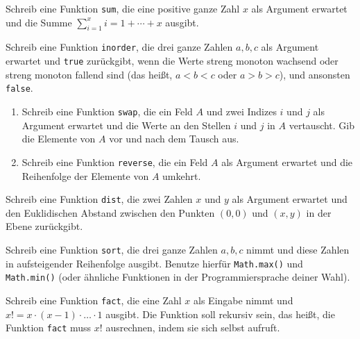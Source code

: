 \documentclass{uebung_cs}
\begin{document}
\begin{aufgabe}[Summe]
    Schreib eine Funktion \texttt{sum}, die eine positive ganze Zahl $x$ als Argument erwartet und die Summe $\sum_{i=1}^x i = 1+\cdots+x$ ausgibt.
\end{aufgabe}

\begin{aufgabe}
    Schreib eine Funktion \texttt{inorder}, die drei ganze Zahlen $a,b,c$ als Argument erwartet und \texttt{true} zurückgibt, wenn die Werte streng monoton wachsend oder streng monoton fallend sind (das heißt, $a<b<c$ oder $a>b>c$), und ansonsten \texttt{false}.
\end{aufgabe}

\begin{aufgabe}\mbox{}
    \begin{enumerate}
        \item Schreib eine Funktion \texttt{swap}, die ein Feld $A$ und zwei Indizes $i$ und $j$ als Argument erwartet und die Werte an den Stellen $i$ und $j$ in $A$ vertauscht. Gib die Elemente von $A$ vor und nach dem Tausch aus.
        \item Schreib eine Funktion \texttt{reverse}, die ein Feld $A$ als Argument erwartet und die Reihenfolge der Elemente von $A$ umkehrt.
    \end{enumerate}
\end{aufgabe}

\begin{aufgabe}[Abstand]
    Schreib eine Funktion \texttt{dist}, die zwei Zahlen $x$ und $y$ als Argument erwartet und den Euklidischen Abstand zwischen den Punkten $(0,0)$ und $(x,y)$ in der Ebene zurückgibt.
\end{aufgabe}

\begin{aufgabe}
    Schreib eine Funktion \texttt{sort}, die drei ganze Zahlen $a,b,c$ nimmt und diese Zahlen in aufsteigender Reihenfolge ausgibt. Benutze hierfür \texttt{Math.max()} und \texttt{Math.min()} (oder ähnliche Funktionen in der Programmiersprache deiner Wahl).
\end{aufgabe}

\begin{aufgabe}[Fakultät]
    Schreib eine Funktion \texttt{fact}, die eine Zahl $x$ als Eingabe nimmt und $x!=x\cdot (x-1)\cdot\ldots\cdot 1$ ausgibt.
    Die Funktion soll rekursiv sein, das heißt, die Funktion \texttt{fact} muss $x!$ ausrechnen, indem sie sich selbst aufruft.
\end{aufgabe}
\end{document}
